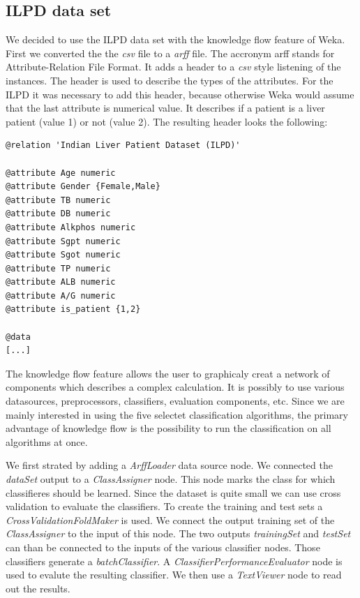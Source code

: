 \documentclass[a4paper]{article}
\begin{document}
\subsection{ILPD data set}
We decided to use the ILPD data set with the knowledge flow feature of Weka.
First we converted the the \emph{csv} file to a \emph{arff} file. The accronym
arff stands for Attribute-Relation File Format. It adds a header to a \emph{csv}
style listening of the instances. The header is used to describe the types of
the attributes. For the ILPD it was necessary to add this header, because
otherwise Weka would assume that the last attribute is numerical value. It
describes if a patient is a liver patient (value 1) or not (value 2). 
The resulting header looks the following:
\begin{verbatim}
@relation 'Indian Liver Patient Dataset (ILPD)'

@attribute Age numeric
@attribute Gender {Female,Male}
@attribute TB numeric
@attribute DB numeric
@attribute Alkphos numeric
@attribute Sgpt numeric
@attribute Sgot numeric
@attribute TP numeric
@attribute ALB numeric
@attribute A/G numeric
@attribute is_patient {1,2}

@data
[...]
\end{verbatim}

The knowledge flow feature allows the user to graphicaly creat a network of
components which describes a complex calculation. It is possibly to use various
datasources, preprocessors, classifiers, evaluation components, etc. Since we
are mainly interested in using the five selectet classification algorithms, the
primary advantage of knowledge flow is the possibility to run the classification
on all algorithms at once. 

We first strated by adding a \emph{ArffLoader} data source node. We connected
the \emph{dataSet} output to a \emph{ClassAssigner} node. This node marks the
class for which classifieres should be learned. Since the dataset is quite small
we can use cross validation to evaluate the classifiers. To create the training
and test sets a \emph{CrossValidationFoldMaker} is used. We connect the output
training set of the \emph{ClassAssigner} to the input of this node. The two
outputs \emph{trainingSet} and \emph{testSet} can than be connected to the
inputs of the various classifier nodes. Those classifiers generate a
\emph{batchClassifier}. A \emph{ClassifierPerformanceEvaluator} node is used to
evalute the resulting classifier. We then use a \emph{TextViewer} node to read
out the results.
\end{document}
